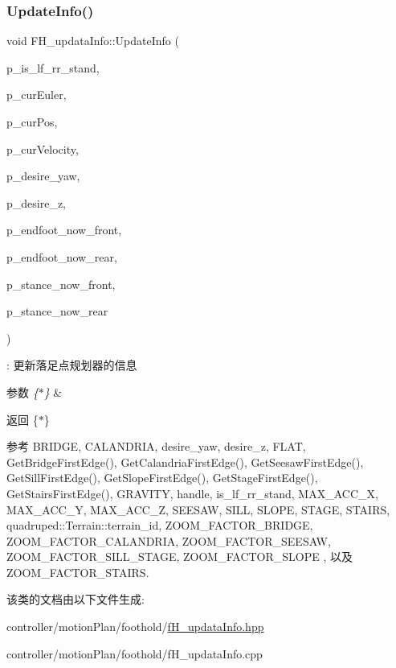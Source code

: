 \subsubsection{\texorpdfstring{Update\+Info()}{UpdateInfo()}}
{\footnotesize\ttfamily void F\+H\+\_\+updata\+Info\+::\+Update\+Info (\begin{DoxyParamCaption}\item[{int}]{p\+\_\+is\+\_\+lf\+\_\+rr\+\_\+stand,  }\item[{\hyperlink{cppTypes_8h_a65c27bf97693676535dd0b30ea0ad399}{Vec3}$<$ double $>$}]{p\+\_\+cur\+Euler,  }\item[{\hyperlink{cppTypes_8h_a65c27bf97693676535dd0b30ea0ad399}{Vec3}$<$ double $>$}]{p\+\_\+cur\+Pos,  }\item[{\hyperlink{cppTypes_8h_a65c27bf97693676535dd0b30ea0ad399}{Vec3}$<$ double $>$}]{p\+\_\+cur\+Velocity,  }\item[{double}]{p\+\_\+desire\+\_\+yaw,  }\item[{double}]{p\+\_\+desire\+\_\+z,  }\item[{\hyperlink{cppTypes_8h_a65c27bf97693676535dd0b30ea0ad399}{Vec3}$<$ double $>$}]{p\+\_\+endfoot\+\_\+now\+\_\+front,  }\item[{\hyperlink{cppTypes_8h_a65c27bf97693676535dd0b30ea0ad399}{Vec3}$<$ double $>$}]{p\+\_\+endfoot\+\_\+now\+\_\+rear,  }\item[{\hyperlink{cppTypes_8h_a65c27bf97693676535dd0b30ea0ad399}{Vec3}$<$ double $>$}]{p\+\_\+stance\+\_\+now\+\_\+front,  }\item[{\hyperlink{cppTypes_8h_a65c27bf97693676535dd0b30ea0ad399}{Vec3}$<$ double $>$}]{p\+\_\+stance\+\_\+now\+\_\+rear }\end{DoxyParamCaption})}

\+: 更新落足点规划器的信息 
\begin{DoxyParams}{参数}
{\em \{$\ast$\}} & \\
\hline
\end{DoxyParams}
\begin{DoxyReturn}{返回}
\{$\ast$\} 
\end{DoxyReturn}


参考 B\+R\+I\+D\+GE, C\+A\+L\+A\+N\+D\+R\+IA, desire\+\_\+yaw, desire\+\_\+z, F\+L\+AT, Get\+Bridge\+First\+Edge(), Get\+Calandria\+First\+Edge(), Get\+Seesaw\+First\+Edge(), Get\+Sill\+First\+Edge(), Get\+Slope\+First\+Edge(), Get\+Stage\+First\+Edge(), Get\+Stairs\+First\+Edge(), G\+R\+A\+V\+I\+TY, handle, is\+\_\+lf\+\_\+rr\+\_\+stand, M\+A\+X\+\_\+\+A\+C\+C\+\_\+X, M\+A\+X\+\_\+\+A\+C\+C\+\_\+Y, M\+A\+X\+\_\+\+A\+C\+C\+\_\+Z, S\+E\+E\+S\+AW, S\+I\+LL, S\+L\+O\+PE, S\+T\+A\+GE, S\+T\+A\+I\+RS, quadruped\+::\+Terrain\+::terrain\+\_\+id, Z\+O\+O\+M\+\_\+\+F\+A\+C\+T\+O\+R\+\_\+\+B\+R\+I\+D\+GE, Z\+O\+O\+M\+\_\+\+F\+A\+C\+T\+O\+R\+\_\+\+C\+A\+L\+A\+N\+D\+R\+IA, Z\+O\+O\+M\+\_\+\+F\+A\+C\+T\+O\+R\+\_\+\+S\+E\+E\+S\+AW, Z\+O\+O\+M\+\_\+\+F\+A\+C\+T\+O\+R\+\_\+\+S\+I\+L\+L\+\_\+\+S\+T\+A\+GE, Z\+O\+O\+M\+\_\+\+F\+A\+C\+T\+O\+R\+\_\+\+S\+L\+O\+PE , 以及 Z\+O\+O\+M\+\_\+\+F\+A\+C\+T\+O\+R\+\_\+\+S\+T\+A\+I\+RS.



该类的文档由以下文件生成\+:\begin{DoxyCompactItemize}
\item 
controller/motion\+Plan/foothold/\hyperlink{fH__updataInfo_8hpp}{f\+H\+\_\+updata\+Info.\+hpp}\item 
controller/motion\+Plan/foothold/f\+H\+\_\+updata\+Info.\+cpp\end{DoxyCompactItemize}
